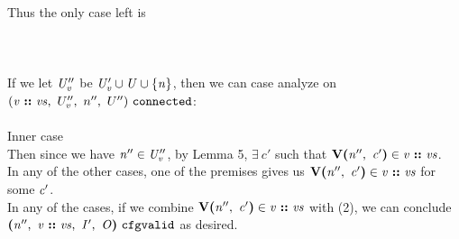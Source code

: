 \documentclass[12pt]{article}
\begin{document}
Thus the only case left is\\
\\
\\
\\

If we let $\mathit{U_v''}$ be $\mathit{U_v' \cup U \cup \{n\}}$, then we can
case analyze on $(\mathit{v}\ \textbf{::}\ \mathit{vs},\ U_v'',\ n'',\ U'')\ \mathtt{connected}$:\\
\\

Inner case
\\

Then since we have $\mathit{n''} \in \mathit{U_v''}$, by Lemma 5, $\exists\ c'$
such that $\textbf{V(}\mathit{n''},\ \mathit{c'}\textbf{)} \in \mathit{v}\ \textbf{::}\ \mathit{vs}$.\\

In any of the other cases, one of the premises gives us
$\textbf{V(}\mathit{n''},\ \mathit{c'}\textbf{)} \in \mathit{v}\ \textbf{::}\ \mathit{vs}$ for some
$\mathit{c'}$.
\\

In any of the cases, if we combine $\textbf{V(}\mathit{n''},\ \mathit{c'}\textbf{)} \in
\mathit{v}\ \textbf{::}\ \mathit{vs}$ with (2), we can conclude
$\textbf{(}\mathit{n''},\ \mathit{v}\ \textbf{::}\ \mathit{vs},\ \mathit{I'},\ \mathit{O}\textbf{)}\ \mathtt{cfgvalid}$
as desired.\\
\\
\end{document}
